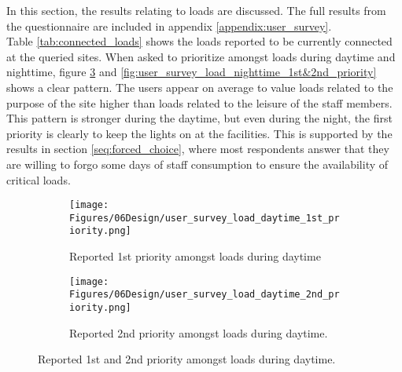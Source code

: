 In this section, the results relating to loads are discussed. The full results from the questionnaire are included in appendix \ref{appendix:user_survey}. \\

Table \ref{tab:connected_loads} shows the loads reported to be currently connected at the queried sites. When asked to prioritize amongst loads during daytime and nighttime, figure \ref{fig:user_survey_load_daytime_1st&2nd_priority} and \ref{fig:user_survey_load_nighttime_1st&2nd_priority} shows a clear pattern. The users appear on average to value loads related to the purpose of the site higher than loads related to the leisure of the staff members. This pattern is stronger during the daytime, but even during the night, the first priority is clearly to keep the lights on at the facilities. This is supported by the results in section \ref{seq:forced_choice}, where most respondents answer that they are willing to forgo some days of staff consumption to ensure the availability of critical loads.

\begin{figure}[]
  \centering

  \begin{subfigure}{\textwidth}
    \centering
    \texttt{[image: Figures/06Design/user\_survey\_load\_daytime\_1st\_priority.png]}
    \caption[User survey: Daytime 1st priority]{Reported 1st priority amongst loads during daytime}
    \label{fig:user_survey_load_daytime_1st_priority}
  \end{subfigure}

  \vspace{0.5cm}

  \begin{subfigure}{\textwidth}
    \centering
    \texttt{[image: Figures/06Design/user\_survey\_load\_daytime\_2nd\_priority.png]}
    \caption[User survey: Daytime 2nd priority]{Reported 2nd priority amongst loads during daytime.}
    \label{fig:user_survey_load_daytime_2nd_priority}
  \end{subfigure}

  \caption[User survey: Daytime priority]{Reported 1st and 2nd priority amongst loads during daytime.}
  \label{fig:user_survey_load_daytime_1st&2nd_priority}
\end{figure}


